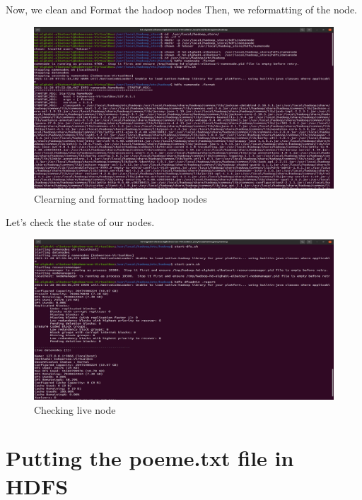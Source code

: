 \begin{spacing}{1.2}
\par Now, we clean and Format the hadoop nodes Then, we reformatting of the node.
\\
\begin{figure}[!htb] 
\begin{center} 
\includegraphics[width=1\linewidth]{Big_Data/Spark/Running a Spark Batch app in Java/Clearning and formatting hadoop nodes} 
\end{center} 
\caption{Clearning and formatting hadoop nodes} 
\end{figure} 
\FloatBarrier



\par Let's check the state of our nodes.
\\
\begin{figure}[!htb] 
\begin{center} 
\includegraphics[width=1\linewidth]{Big_Data/Spark/Running a Spark Batch app in Java/Checking live node} 
\end{center} 
\caption{Checking live node} 
\end{figure} 
\FloatBarrier

\section{Putting the poeme.txt file in HDFS}


\end{spacing}
